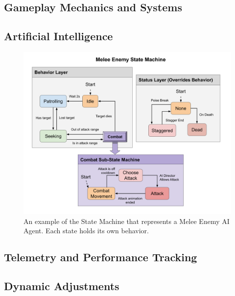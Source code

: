 \documentclass[cic,tc,english]{iiufrgs}
\begin{document}
\subsection{Gameplay Mechanics and Systems}

\subsection{Artificial Intelligence}



\begin{figure}[!h]
    \caption{An example of the State Machine that represents a Melee Enemy AI Agent. Each state holds its own behavior.}
    \begin{center}
        \includegraphics[width=40em]{figures/fig-melee-ai-state-machine.png}
    \end{center}
    \label{fig:ex1}
\end{figure}

\subsection{Telemetry and Performance Tracking}

\subsection{Dynamic Adjustments}
\end{document}

